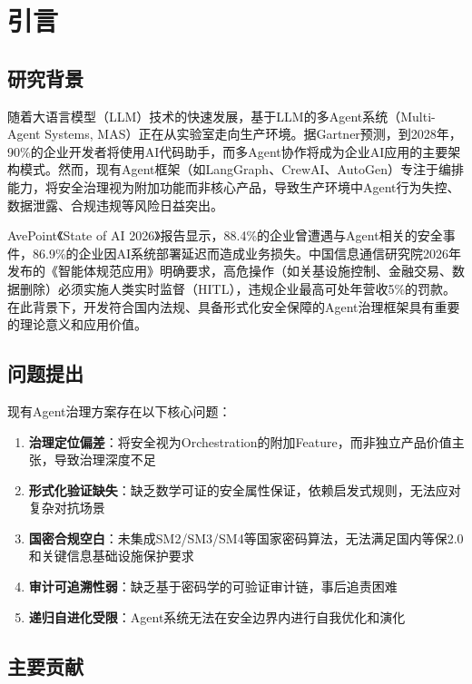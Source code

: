 
\section{引言}

\subsection{研究背景}

随着大语言模型（LLM）技术的快速发展，基于LLM的多Agent系统（Multi-Agent Systems, MAS）正在从实验室走向生产环境。据Gartner预测，到2028年，90\%的企业开发者将使用AI代码助手，而多Agent协作将成为企业AI应用的主要架构模式。然而，现有Agent框架（如LangGraph、CrewAI、AutoGen）专注于编排能力，将安全治理视为附加功能而非核心产品，导致生产环境中Agent行为失控、数据泄露、合规违规等风险日益突出。

AvePoint《State of AI 2026》报告显示，88.4\%的企业曾遭遇与Agent相关的安全事件，86.9\%的企业因AI系统部署延迟而造成业务损失。中国信息通信研究院2026年发布的《智能体规范应用》明确要求，高危操作（如关基设施控制、金融交易、数据删除）必须实施人类实时监督（HITL），违规企业最高可处年营收5\%的罚款。在此背景下，开发符合国内法规、具备形式化安全保障的Agent治理框架具有重要的理论意义和应用价值。

\subsection{问题提出}

现有Agent治理方案存在以下核心问题：

\begin{enumerate}
    \item \textbf{治理定位偏差}：将安全视为Orchestration的附加Feature，而非独立产品价值主张，导致治理深度不足
    \item \textbf{形式化验证缺失}：缺乏数学可证的安全属性保证，依赖启发式规则，无法应对复杂对抗场景
    \item \textbf{国密合规空白}：未集成SM2/SM3/SM4等国家密码算法，无法满足国内等保2.0和关键信息基础设施保护要求
    \item \textbf{审计可追溯性弱}：缺乏基于密码学的可验证审计链，事后追责困难
    \item \textbf{递归自进化受限}：Agent系统无法在安全边界内进行自我优化和演化
\end{enumerate}

\subsection{主要贡献}

